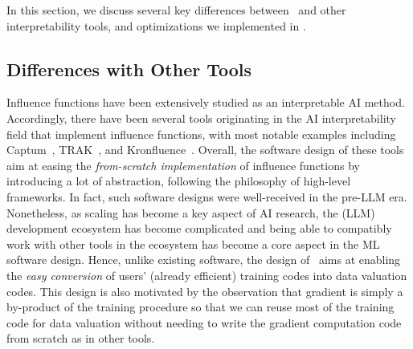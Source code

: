 In this section, we discuss several key differences between \software\ and other interpretability tools, and optimizations we implemented in \software.

\subsection{Differences with Other Tools}
Influence functions have been extensively studied as an interpretable AI method. Accordingly, there have been several tools originating in the AI interpretability field that implement influence functions, with most notable examples including Captum~\cite{kokhlikyan2020captum}, TRAK~\cite{park2023trak}, and Kronfluence~\cite{grosse2023studying}. Overall, the software design of these tools aim at easing the \textit{from-scratch implementation} of influence functions by introducing a lot of abstraction, following the philosophy of high-level frameworks. In fact, such software designs were well-received in the pre-LLM era. Nonetheless, as scaling has become a key aspect of AI research, the (LLM) development ecosystem has become complicated and being able to compatibly work with other tools in the ecosystem has become a core aspect in the ML software design. Hence, unlike existing software, the design of \software\ aims at enabling the \textit{easy conversion} of users' (already efficient) training codes into data valuation codes. This design is also motivated by the observation that gradient is simply a by-product of the training procedure so that we can reuse most of the training code for data valuation without needing to write the gradient computation code from scratch as in other tools.


